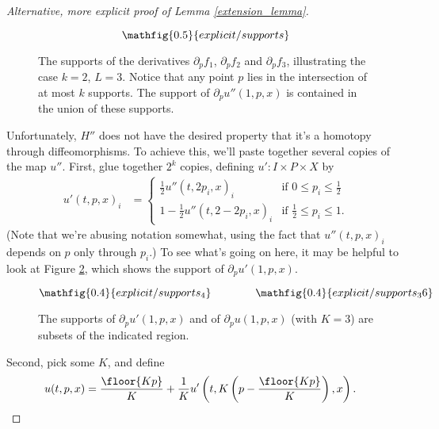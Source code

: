 \begin{proof}[Alternative, more explicit proof of Lemma \ref{extension_lemma}]
\begin{figure}[!ht]
\begin{equation*}
\mathfig{0.5}{explicit/supports}
\end{equation*}
\caption{The supports of the derivatives {\color{green}$\partial_p f_1$}, {\color{blue}$\partial_p f_2$} and {\color{red}$\partial_p f_3$}, illustrating the case $k=2$, $L=3$. Notice that any
point $p$ lies in the intersection of at most $k$ supports. The support of $\partial_p u''(1,p,x)$ is contained in the union of these supports.}
\label{fig:supports}
\end{figure}

Unfortunately, $H''$ does not have the desired property that it's a homotopy through diffeomorphisms. To achieve this, we'll paste together several copies
of the map $u''$. First, glue together $2^k$ copies, defining $u':I \times P \times X$ by
\begin{align*}
u'(t,p,x)_i & =
\begin{cases}
\frac{1}{2} u''(t, 2p_i, x)_i & \text{if $0 \leq p_i \leq \frac{1}{2}$} \\
1-\frac{1}{2} u''(t, 2-2p_i, x)_i & \text{if $\frac{1}{2} \leq p_i \leq 1$}.
\end{cases}
\end{align*}
(Note that we're abusing notation somewhat, using the fact that $u''(t,p,x)_i$ depends on $p$ only through $p_i$.)
To see what's going on here, it may be helpful to look at Figure \ref{fig:supports_4}, which shows the support of $\partial_p u'(1,p,x)$.
\begin{figure}[!ht]
\begin{equation*}
\mathfig{0.4}{explicit/supports_4} \qquad \qquad \mathfig{0.4}{explicit/supports_36}
\end{equation*}
\caption{The supports of $\partial_p u'(1,p,x)$ and of $\partial_p u(1,p,x)$ (with $K=3$) are subsets of the indicated region.}
\label{fig:supports_4}
\end{figure}

Second, pick some $K$, and define
\begin{align*}
u(t,p,x) & = \frac{\floor{K p}}{K} + \frac{1}{K} u'\left(t, K \left(p - \frac{\floor{K p}}{K}\right), x\right).
\end{align*}



\end{proof}
